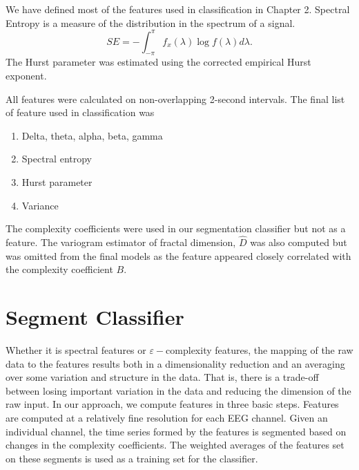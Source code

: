 We have defined most of the features used in classification in Chapter 2. Spectral Entropy is a measure of the distribution in the spectrum of a signal. 
\[  
  SE = - \int_{-\pi}^{\pi} f_x(\lambda) \log f(\lambda) d \lambda.
\]
The Hurst parameter was estimated using the corrected empirical Hurst exponent\cite{weron2002}.  
 
All features were calculated on non-overlapping 2-second intervals. The final list of feature used in classification was 
\begin{enumerate}
\item Delta, theta, alpha, beta, gamma 
\item Spectral entropy 
\item Hurst parameter
\item Variance
\end{enumerate}

The complexity coefficients were used in our segmentation 
classifier but not as a feature. The variogram estimator of fractal dimension, $\hat D$ was also computed but was omitted from the final models as the feature appeared closely correlated with the complexity coefficient $B$. 



\section{Segment Classifier}

Whether it is spectral features or $\varepsilon-$complexity 
features, the mapping of the raw data to the 
features results both in a dimensionality 
reduction and an averaging over some variation and structure 
in the data. That is, there is a trade-off between losing 
important variation in the data and reducing the dimension
of the raw input. In our approach, we compute features 
in three basic steps. Features are computed at a relatively 
fine resolution for each EEG channel. Given an 
individual channel, the time series formed by the features
is segmented based on changes in the complexity coefficients. 
The weighted averages of the features set on these segments is
used as a training set for the classifier. 


